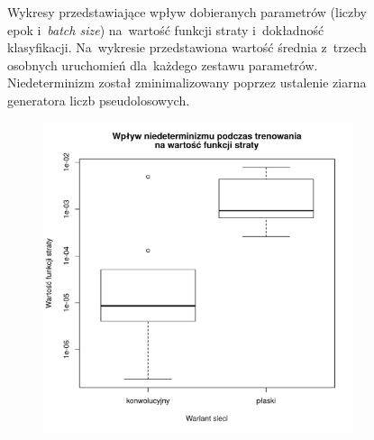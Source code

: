 \documentclass[11pt,a4paper]{article}
\begin{document}
\begin{figure}
\begin{subfigure}{0.45\textwidth}
    \end{subfigure}
    \caption{Wykresy przedstawiające wpływ dobieranych parametrów (liczby epok i~\emph{batch size}) na~wartość funkcji straty i~dokładność klasyfikacji.
    Na~wykresie przedstawiona wartość średnia z~trzech osobnych uruchomień dla~każdego zestawu parametrów.
    Niedeterminizm został zminimalizowany poprzez ustalenie ziarna generatora liczb pseudolosowych.}
    \label{fig:epoch-batch-influence}
\end{figure}

\begin{figure}
    \centering
    \begin{subfigure}{0.45\textwidth}
        \includegraphics[width=\textwidth]{res/img/randomness_loss.pdf}
    \end{subfigure}
    \qquad
    \begin{subfigure}{0.45\textwidth}

\end{subfigure}
\end{figure}
\end{document}
